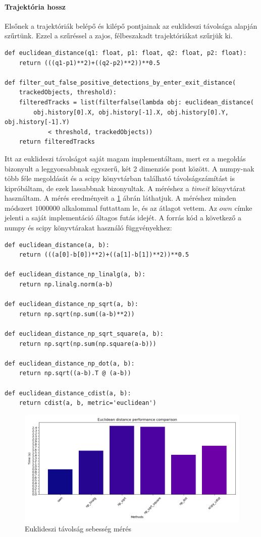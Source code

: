 \documentclass[12pt,a4paper]{article}
\begin{document}
\paragraph{Trajektória hossz} Elsőnek a trajektóriák belépő és kilépő pontjainak az euklideszi távolsága alapján szűrtünk. Ezzel a szűréssel a zajos, félbeszakadt trajektóriákat szűrjük ki.
\begin{verbatim}
def euclidean_distance(q1: float, p1: float, q2: float, p2: float):
    return (((q1-p1)**2)+((q2-p2)**2))**0.5

def filter_out_false_positive_detections_by_enter_exit_distance(
    trackedObjects, threshold):
    filteredTracks = list(filterfalse(lambda obj: euclidean_distance(
        obj.history[0].X, obj.history[-1].X, obj.history[0].Y, obj.history[-1].Y) 
            < threshold, trackedObjects))
    return filteredTracks
\end{verbatim}
Itt az euklideszi távolságot saját magam implementáltam, mert ez a megoldás bizonyult a leggyorsabbnak egyszerű, két 2 dimenziós pont között.
A numpy-nak több féle megoldását és a scipy könyvtárban található távolságszámítást is kipróbáltam, de ezek lassabbnak bizonyultak.
A méréshez a \textit{timeit} könyvtárat használtam. A mérés eredményeit a \ref{fig:EuclideanDistance} ábrán láthatjuk. A méréshez minden módszert $1000000$ alkalommal futtattam le, és az átlagot vettem. 
Az $own$ címke jelenti a saját implementáció áltagos futás idejét. A forrás kód a következő a numpy és scipy könyvtárakat használó függvényekhez:
\newpage
\begin{verbatim}
def euclidean_distance(a, b):
    return (((a[0]-b[0])**2)+((a[1]-b[1])**2))**0.5

def euclidean_distance_np_linalg(a, b):
    return np.linalg.norm(a-b)

def euclidean_distance_np_sqrt(a, b):
    return np.sqrt(np.sum((a-b)**2))

def euclidean_distance_np_sqrt_square(a, b):
    return np.sqrt(np.sum(np.square(a-b)))

def euclidean_distance_np_dot(a, b):
    return np.sqrt((a-b).T @ (a-b))

def euclidean_distance_cdist(a, b):
    return cdist(a, b, metric='euclidean')    
\end{verbatim}

\begin{figure}[H]
    \includegraphics[width=1\columnwidth]{euclidean_distance_performance.png}
    \caption{Euklideszi távolság sebesség mérés}
    \label{fig:EuclideanDistance}
\end{figure}
\end{document}
